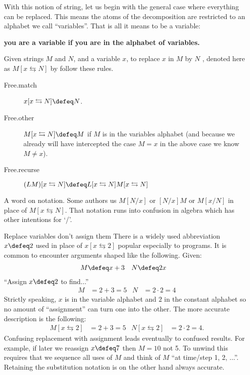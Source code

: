 With this notion of string, let us begin with the general case where everything 
can be replaced.  This means the atoms of the decomposition are restricted to an
alphabet we call ``variables''. That is all it means to be a variable:
\begin{center}
    \textbf{you are a
variable if you are in the alphabet of variables. }
\end{center}

\begin{definition}
    Given strings $M$ and $N$, and a variable $x$, to replace $x$ in $M$ by $N$ ,
    denoted here as $M[x\leftrightarrows N]$ by follow these rules.
    \begin{description}
        \item[Free.match] $x[x\leftrightarrows N]\defeq N$.
        \item[Free.other] $M[x\leftrightarrows N]\defeq M$ if $M$ is in the variables alphabet (and 
        because we already will have intercepted the case $M=x$ in the above case we know $M\neq x$).
        
        \item[Free.recurse] $(LM)[x\leftrightarrows N]\defeq L[x\leftrightarrows N]M[x\leftrightarrows N]$
    \end{description}
\end{definition}

A word on notation.  Some authors us $M[N/x]$ or $[N/x]M$ or $M[x/N]$ in place
of $M[x\leftrightarrows N]$.  That notation runs into confusion in algebra
which has other intentions for `/'. 

\begin{remark}{Replace variables don't assign them}
    There is a widely used abbreviation $x\defeq 2$ used 
    in place of $x[x\leftrightarrows 2]$ popular especially to programs.  
    It is common to encounter arguments shaped like the following.  Given:
    \begin{align*}
        M & \defeq x+3 & N & \defeq 2x
    \end{align*}
    ``Assign $x \defeq 2$ to find...''
    \begin{align*}
        M  & = 2+3 =5 & N & = 2\cdot 2 =4
    \end{align*}
    Strictly speaking, $x$ is in the variable alphabet and $2$ in the constant 
    alphabet so no amount of ``assignment'' can turn one into the other.
    The more accurate description is the following:
    \begin{align*}
        M[x\leftrightarrows 2] & = 2+3=5 & N[x\leftrightarrows 2] & = 2\cdot 2=4.
    \end{align*}
    Confusing replacement with assignment leads eventually to confused 
    results.  For example, if later we reassign $x\defeq 7$ then $M=10$ not 5.
    To unwind this requires that we sequence all uses of $M$ and think of $M$ 
    ``at time/step 1, 2, ...''.  Retaining the substitution notation is 
    on the other hand always accurate.
\end{remark}



